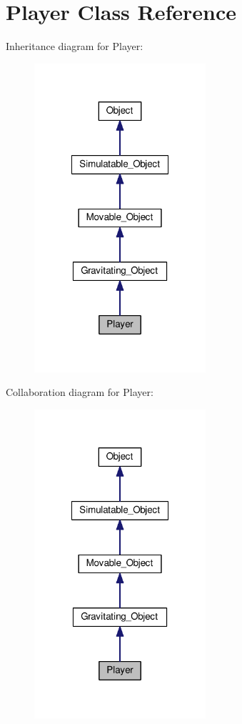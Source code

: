 \hypertarget{classPlayer}{\section{Player Class Reference}
\label{classPlayer}
}


Inheritance diagram for Player\+:\nopagebreak
\begin{figure}[H]
\begin{center}
\leavevmode
\includegraphics[width=180pt]{classPlayer__inherit__graph}
\end{center}
\end{figure}


Collaboration diagram for Player\+:\nopagebreak
\begin{figure}[H]
\begin{center}
\leavevmode
\includegraphics[width=180pt]{classPlayer__coll__graph}
\end{center}
\end{figure}
